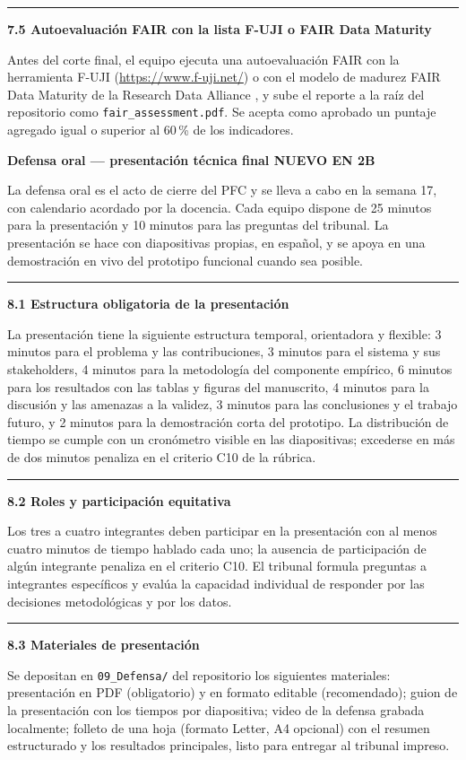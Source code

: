 \documentclass[11pt,a4paper]{article}
\newcounter{secc}
\newcommand{\secband}[1]{%
    \stepcounter{secc}\par\vspace{9pt}\noindent
    {\setlength{\fboxsep}{0pt}%
        \colorbox{uteqgold}{\parbox[c][20pt][c]{0.05\textwidth}{\centering\textbf{\color{white}\small \arabic{secc}}}}%
        \colorbox{uteqgreen}{\parbox[c][20pt][c]{0.95\textwidth}{\hspace{8pt}\textbf{\color{white}\small #1}}}%
    }\par\vspace{5pt}}
\newcommand{\submark}[1]{\par\vspace{4pt}\noindent
    {\color{uteqgreen}\rule[-1pt]{3.5pt}{12pt}}\hspace{6pt}\textbf{\color{uteqgreen}#1}\par\vspace{2pt}}
\newcommand{\bF}{{\setlength{\fboxsep}{1.5pt}\colorbox{crimsonfin}{\scriptsize\bfseries\color{white}NUEVO EN 2B}}}
\begin{document}
\submark{7.5 Autoevaluación FAIR con la lista F-UJI o FAIR Data Maturity}
Antes del corte final, el equipo ejecuta una autoevaluación FAIR con la herramienta F-UJI (\url{https://www.f-uji.net/}) o con el modelo de madurez FAIR Data Maturity de la Research Data Alliance \cite{rda2020fair}, y sube el reporte a la raíz del repositorio como \texttt{fair\_assessment.pdf}.
Se acepta como aprobado un puntaje agregado igual o superior al 60\,\% de los indicadores.
\secband{Defensa oral --- presentación técnica final \bF}

La defensa oral es el acto de cierre del PFC y se lleva a cabo en la semana 17, con calendario acordado por la docencia.
Cada equipo dispone de 25 minutos para la presentación y 10 minutos para las preguntas del tribunal.
La presentación se hace con diapositivas propias, en español, y se apoya en una demostración en vivo del prototipo funcional cuando sea posible.

\submark{8.1 Estructura obligatoria de la presentación}
La presentación tiene la siguiente estructura temporal, orientadora y flexible: 3 minutos para el problema y las contribuciones, 3 minutos para el sistema y sus stakeholders, 4 minutos para la metodología del componente empírico, 6 minutos para los resultados con las tablas y figuras del manuscrito, 4 minutos para la discusión y las amenazas a la validez, 3 minutos para las conclusiones y el trabajo futuro, y 2 minutos para la demostración corta del prototipo.
La distribución de tiempo se cumple con un cronómetro visible en las diapositivas; excederse en más de dos minutos penaliza en el criterio C10 de la rúbrica.

\submark{8.2 Roles y participación equitativa}
Los tres a cuatro integrantes deben participar en la presentación con al menos cuatro minutos de tiempo hablado cada uno; la ausencia de participación de algún integrante penaliza en el criterio C10.
El tribunal formula preguntas a integrantes específicos y evalúa la capacidad individual de responder por las decisiones metodológicas y por los datos.

\submark{8.3 Materiales de presentación}
Se depositan en \texttt{09\_Defensa/} del repositorio los siguientes materiales: presentación en PDF (obligatorio) y en formato editable (recomendado); guion de la presentación con los tiempos por diapositiva; video de la defensa grabada localmente; folleto de una hoja (formato Letter, A4 opcional) con el resumen estructurado y los resultados principales, listo para entregar al tribunal impreso.
\end{document}
